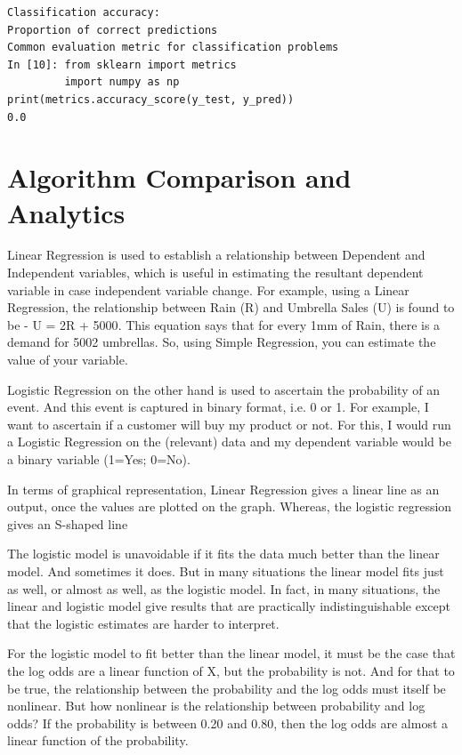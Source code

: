 \documentclass[sigconf]{acmart}
\begin{document}
\begin{lstlisting}
Classification accuracy: 
Proportion of correct predictions
Common evaluation metric for classification problems
In [10]: from sklearn import metrics
         import numpy as np
print(metrics.accuracy_score(y_test, y_pred))
0.0
\end{lstlisting}

\section{Algorithm Comparison and Analytics}
\par 
Linear Regression is used to establish a relationship between Dependent and Independent variables, which is useful in estimating the resultant dependent variable in case independent variable change. For example, using a Linear Regression, the relationship between Rain (R) and Umbrella Sales (U) is found to be - U = 2R + 5000\cite{C3}. This equation says that for every 1mm of Rain, there is a demand for 5002 umbrellas. So, using Simple Regression, you can estimate the value of your variable.

\par 
Logistic Regression on the other hand is used to ascertain the probability of an event. And this event is captured in binary format, i.e. 0 or 1. For example, I want to ascertain if a customer will buy my product or not. For this, I would run a Logistic Regression on the (relevant) data and my dependent variable would be a binary variable (1=Yes; 0=No).

\par
In terms of graphical representation, Linear Regression gives a linear line as an output, once the values are plotted on the graph. Whereas, the logistic regression gives an S-shaped line

\par
The logistic model is unavoidable if it fits the data much better than the linear model. And sometimes it does. But in many situations the linear model fits just as well, or almost as well, as the logistic model. In fact, in many situations, the linear and logistic model give results that are practically indistinguishable except that the logistic estimates are harder to interpret\cite{C3}.

\par
For the logistic model to fit better than the linear model, it must be the case that the log odds are a linear function of X, but the probability is not. And for that to be true, the relationship between the probability and the log odds must itself be nonlinear. But how nonlinear is the relationship between probability and log odds? If the probability is between 0.20 and 0.80, then the log odds are almost a linear function of the probability\cite{C3}.
\end{document}
